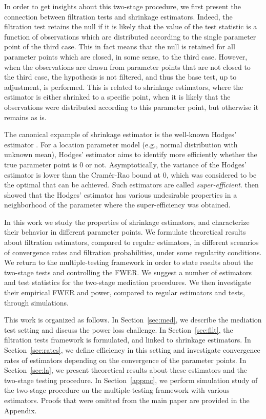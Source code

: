 \documentclass[ejs, twoside]{imsart}
\theoremstyle{plain}
\theoremstyle{remark}
\numberwithin{equation}{section}
\numberwithin{table}{section}
\numberwithin{figure}{section}
\begin{document}
In order to get insights about this two-stage procedure, we first present the connection between filtration tests and shrinkage estimators. Indeed, the filtration test retains the null if it is likely that the value of the test statistic is a function of observations which are distributed according to the single parameter point of the third case. %
This in fact means that the null is retained for all parameter points which are closed, in some sense, to the third case. However, when the observations are drawn from parameter points that are not closed to the third case, the hypothesis is not filtered, and thus the base test, up to adjustment, is performed. This is related to shrinkage estimators, where the estimator is either shrinked to a specific point, when it is likely that the observations were distributed according to this parameter point, but otherwise it remains as is.%

The canonical expample of shrinkage estimator is the well-known Hodges' estimator \citep{le_cam_asymptotic_1953}. For a location parameter model (e.g., normal distribution with unknown mean), Hodges' estimator aims to identify more efficiently whether the true parameter point is \(0\) or not. Asymptotically, the variance of the Hodges' estimator is lower than the Cram\'er-Rao bound at \(0\), which was considered to be the optimal that can be achieved. Such estimators are called \emph{super-efficient}. \citet{le_cam_asymptotic_1953} then showed that the Hodges' estimator has various undesirable properties in a neighborhood of the parameter where the super-efficiency was obtained.

In this work we study the properties of shrinkage estimators, and characterize their behavior in different parameter points. We formulate theoretical results about filtration estimators, compared to regular estimators, in different scenarios of convergence rates and filtration probabilities, under some regularity conditions. We return to the multiple-testing framework in order to state results about the two-stage tests and controlling the FWER. We suggest a number of estimators and test statistics for the two-stage mediation procedures. We then investigate their empirical FWER and power, compared to regular estimators and tests, through simulations.

This work is organized as follows. In Section~\ref{sec:med}, we describe the mediation test setting and discuss the power loss challenge. In Section~\ref{sec:filt}, the filtration tests framework is formulated, and linked to shrinkage estimators. In Section~\ref{sec:rates}, we define efficiency in this setting and investigate convergence rates of estimators depending on the convergence of the parameter points. In Section~\ref{sec:la}, we present theoretical results about these estimators and the two-stage testing procedure. In Section~\ref{appmc}, we perform simulation study of the two-stage procedure on the multiple-testing framework with various estimators. Proofs that were omitted from the main paper are provided in the Appendix.
\end{document}
